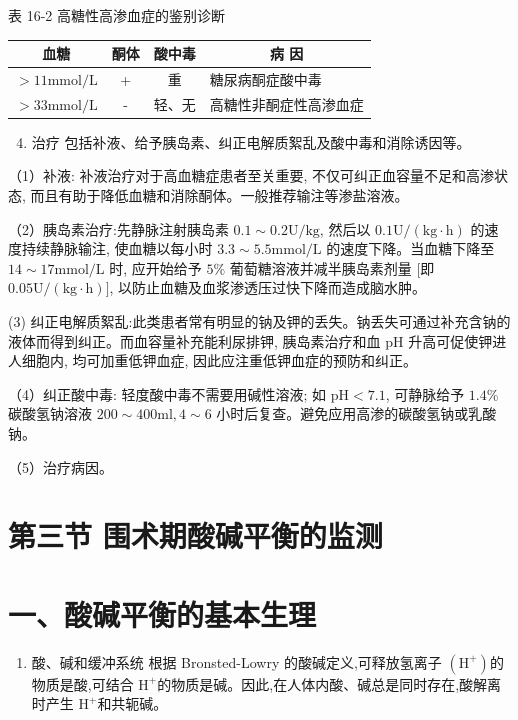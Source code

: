 \documentclass[10pt]{article}
\begin{document}
表 16-2 高糖性高渗血症的鉴别诊断

\begin{center}
\begin{tabular}{cccl}
\hline
血糖 & 酮体 & 酸中毒 & \multicolumn{1}{c}{病 因} \\
\hline
$>11 \mathrm{mmol} / \mathrm{L}$ & + & 重 & 糖尿病酮症酸中毒 \\
$>33 \mathrm{mmol} / \mathrm{L}$ & - & 轻、无 & 高糖性非酮症性高渗血症 \\
\hline
\end{tabular}
\end{center}

\begin{enumerate}
  \setcounter{enumi}{3}
  \item 治疗 包括补液、给予胰岛素、纠正电解质絮乱及酸中毒和消除诱因等。
\end{enumerate}

（1）补液: 补液治疗对于高血糖症患者至关重要, 不仅可纠正血容量不足和高渗状态, 而且有助于降低血糖和消除酮体。一般推荐输注等渗盐溶液。

（2）胰岛素治疗:先静脉注射胰岛素 $0.1 \sim 0.2 \mathrm{U} / \mathrm{kg}$, 然后以 $0.1 \mathrm{U} /(\mathrm{kg} \cdot \mathrm{h})$ 的速度持续静脉输注, 使血糖以每小时 $3.3 \sim 5.5 \mathrm{mmol} / \mathrm{L}$ 的速度下降。当血糖下降至 $14 \sim 17 \mathrm{mmol} / \mathrm{L}$ 时, 应开始给予 $5 \%$ 葡萄糖溶液并减半胰岛素剂量 [即 $0.05 \mathrm{U} /(\mathrm{kg} \cdot \mathrm{h})]$, 以防止血糖及血浆渗透压过快下降而造成脑水肿。

(3) 纠正电解质絮乱:此类患者常有明显的钠及钾的丢失。钠丢失可通过补充含钠的液体而得到纠正。而血容量补充能利尿排钾, 胰岛素治疗和血 $\mathrm{pH}$ 升高可促使钾进人细胞内, 均可加重低钾血症, 因此应注重低钾血症的预防和纠正。

（4）纠正酸中毒: 轻度酸中毒不需要用碱性溶液; 如 $\mathrm{pH}<7.1$, 可静脉给予 $1.4 \%$ 碳酸氢钠溶液 $200 \sim 400 \mathrm{ml}, 4 \sim 6$ 小时后复查。避免应用高渗的碳酸氢钠或乳酸钠。

（5）治疗病因。

\section*{第三节 围术期酸碱平衡的监测}
\section*{一、酸碱平衡的基本生理}
\begin{enumerate}
  \item 酸、碱和缓冲系统 根据 Bronsted-Lowry 的酸碱定义,可释放氢离子 $\left(\mathrm{H}^{+}\right)$的物质是酸,可结合 $\mathrm{H}^{+}$的物质是碱。因此,在人体内酸、碱总是同时存在,酸解离时产生 $\mathrm{H}^{+}$和共轭碱。
\end{enumerate}
\end{document}
